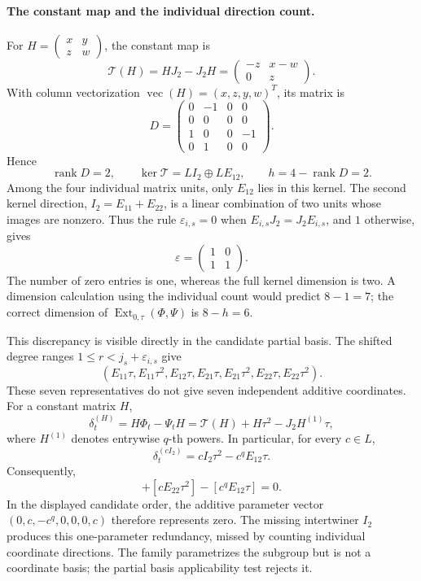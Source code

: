 \paragraph{The constant map and the individual direction count.}
For $H=\begin{pmatrix}x&y\\z&w\end{pmatrix}$, the constant map is
\begin{equation}
 \mathcal T(H)=HJ_2-J_2H
     =\begin{pmatrix}-z&x-w\\0&z\end{pmatrix}.
 \label{eq:partial-j2-constant-map}
\end{equation}
With column vectorization $\operatorname{vec}(H)=(x,z,y,w)^T$, its matrix is
\[
 D=\begin{pmatrix}
  0&-1&0&0\\
  0&0&0&0\\
  1&0&0&-1\\
  0&1&0&0
 \end{pmatrix}.
\]
Hence
\begin{equation}
 \operatorname{rank}D=2,\qquad
 \ker\mathcal T=L I_2\oplus L E_{12},\qquad
 h=4-\operatorname{rank}D=2.
 \label{eq:partial-j2-rank}
\end{equation}
Among the four individual matrix units, only $E_{12}$ lies in this
kernel. The second kernel direction, $I_2=E_{11}+E_{22}$, is a linear
combination of two units whose images are nonzero. Thus the rule
$\varepsilon_{i,s}=0$ when $E_{i,s}J_2=J_2E_{i,s}$, and $1$ otherwise,
gives
\[
 \varepsilon=\begin{pmatrix}1&0\\1&1\end{pmatrix}.
\]
The number of zero entries is one, whereas the full kernel dimension
is two. A dimension calculation using the individual count would predict
$8-1=7$; the correct dimension of
$\operatorname{Ext}_{0,\tau}(\Phi,\Psi)$ is $8-h=6$.

This discrepancy is visible directly in the candidate partial basis.
The shifted degree ranges $1\leq r<j_s+\varepsilon_{i,s}$ give
\[
 (E_{11}\tau,E_{11}\tau^2,E_{12}\tau,
  E_{21}\tau,E_{21}\tau^2,E_{22}\tau,E_{22}\tau^2).
\]
These seven representatives do not give seven independent additive
coordinates. For a constant matrix $H$,
\[
 \delta^{(H)}_t=H\Phi_t-\Psi_tH
   =\mathcal T(H)+H\tau^2-J_2H^{(1)}\tau,
\]
where $H^{(1)}$ denotes entrywise $q$-th powers. In particular, for every
$c\in L$,
\[
 \delta^{(cI_2)}_t=cI_2\tau^2-c^qE_{12}\tau.
\]
Consequently,
\begin{equation}
 [cE_{11}\tau^2]+[cE_{22}\tau^2]-[c^qE_{12}\tau]=0.
 \label{eq:partial-j2-dependence}
\end{equation}
In the displayed candidate order, the additive parameter vector
$(0,c,-c^q,0,0,0,c)$ therefore represents zero. The missing intertwiner
$I_2$ produces this one-parameter redundancy, missed by counting individual
coordinate directions. The family parametrizes the subgroup but is not a
coordinate basis; the partial basis applicability test rejects it.

